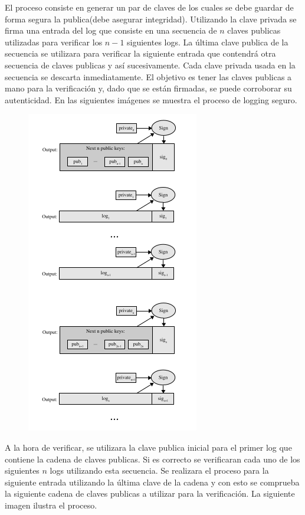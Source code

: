 El proceso consiste en generar un par de claves de los cuales se debe guardar de forma segura la publica(debe asegurar integridad). Utilizando la clave privada se firma una entrada del log que consiste en una secuencia de $n$ claves publicas utilizadas para verificar los $n-1$ siguientes logs. La última clave publica de la secuencia se utilizara para verificar la siguiente entrada que contendrá otra secuencia de claves publicas y así sucesivamente. Cada clave privada usada en la secuencia se descarta inmediatamente. El objetivo es tener las claves publicas a mano para la verificación y, dado que se están firmadas, se puede corroborar su autenticidad. En las siguientes imágenes se muestra el proceso de logging seguro.
\begin{figure}[H]
\centering
\includegraphics[scale=0.4]{imagenes/PublicKey.png}
\end{figure}
A la hora de verificar, se utilizara la clave publica inicial para el primer log que contiene la cadena de claves publicas. Si es correcto se verificaran cada uno de los siguientes $n$ logs utilizando esta secuencia. Se realizara el proceso para la siguiente entrada utilizando la última clave de la cadena y con esto se comprueba la siguiente cadena de claves publicas a utilizar para la verificación. La siguiente imagen ilustra el proceso.
